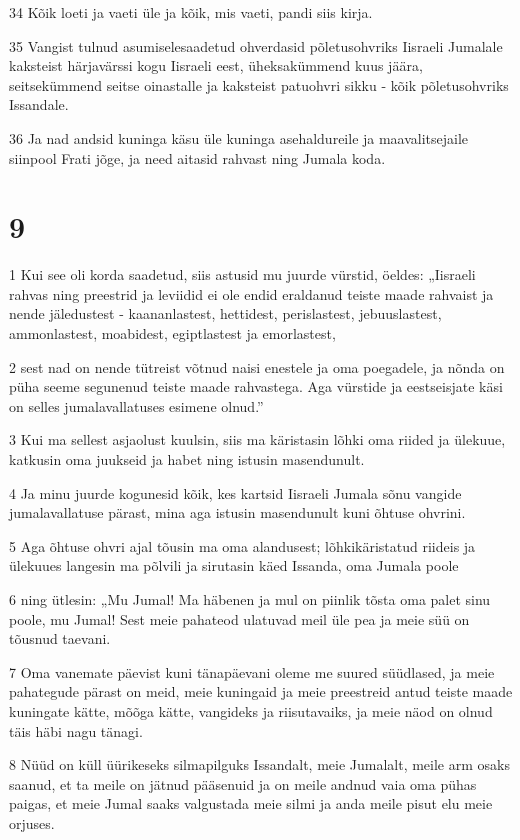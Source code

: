 \par 34 Kõik loeti ja vaeti üle ja kõik, mis vaeti, pandi siis kirja.
\par 35 Vangist tulnud asumiselesaadetud ohverdasid põletusohvriks Iisraeli Jumalale kaksteist härjavärssi kogu Iisraeli eest, üheksakümmend kuus jäära, seitsekümmend seitse oinastalle ja kaksteist patuohvri sikku - kõik põletusohvriks Issandale.
\par 36 Ja nad andsid kuninga käsu üle kuninga asehaldureile ja maavalitsejaile siinpool Frati jõge, ja need aitasid rahvast ning Jumala koda.

\chapter{9}

\par 1 Kui see oli korda saadetud, siis astusid mu juurde vürstid, öeldes: „Iisraeli rahvas ning preestrid ja leviidid ei ole endid eraldanud teiste maade rahvaist ja nende jäledustest - kaananlastest, hettidest, perislastest, jebuuslastest, ammonlastest, moabidest, egiptlastest ja emorlastest,
\par 2 sest nad on nende tütreist võtnud naisi enestele ja oma poegadele, ja nõnda on püha seeme segunenud teiste maade rahvastega. Aga vürstide ja eestseisjate käsi on selles jumalavallatuses esimene olnud.”
\par 3 Kui ma sellest asjaolust kuulsin, siis ma käristasin lõhki oma riided ja ülekuue, katkusin oma juukseid ja habet ning istusin masendunult.
\par 4 Ja minu juurde kogunesid kõik, kes kartsid Iisraeli Jumala sõnu vangide jumalavallatuse pärast, mina aga istusin masendunult kuni õhtuse ohvrini.
\par 5 Aga õhtuse ohvri ajal tõusin ma oma alandusest; lõhkikäristatud riideis ja ülekuues langesin ma põlvili ja sirutasin käed Issanda, oma Jumala poole
\par 6 ning ütlesin: „Mu Jumal! Ma häbenen ja mul on piinlik tõsta oma palet sinu poole, mu Jumal! Sest meie pahateod ulatuvad meil üle pea ja meie süü on tõusnud taevani.
\par 7 Oma vanemate päevist kuni tänapäevani oleme me suured süüdlased, ja meie pahategude pärast on meid, meie kuningaid ja meie preestreid antud teiste maade kuningate kätte, mõõga kätte, vangideks ja riisutavaiks, ja meie näod on olnud täis häbi nagu tänagi.
\par 8 Nüüd on küll üürikeseks silmapilguks Issandalt, meie Jumalalt, meile arm osaks saanud, et ta meile on jätnud pääsenuid ja on meile andnud vaia oma pühas paigas, et meie Jumal saaks valgustada meie silmi ja anda meile pisut elu meie orjuses.

